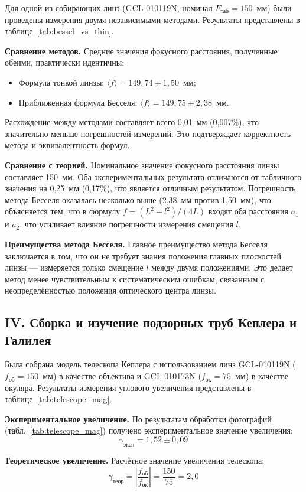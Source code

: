 \documentclass[a4paper]{article}
\begin{document}
Для одной из собирающих линз (GCL-010119N, номинал $F_\text{таб} = 150$~мм) были проведены измерения двумя независимыми методами. Результаты представлены в таблице~\ref{tab:bessel_vs_thin}.

\textbf{Сравнение методов.} Средние значения фокусного расстояния, полученные обеими, практически идентичны:
\begin{itemize}
    \item Формула тонкой линзы: $\langle f \rangle = 149{,}74 \pm 1{,}50$~мм;
    \item Приближенная формула Бесселя: $\langle f \rangle = 149{,}75 \pm 2{,}38$~мм.
\end{itemize}
Расхождение между методами составляет всего 0,01~мм (0,007\%), что значительно меньше погрешностей измерений. Это подтверждает корректность метода и эквивалентность формул.

\textbf{Сравнение с теорией.} Номинальное значение фокусного расстояния линзы составляет 150~мм. Оба экспериментальных результата отличаются от табличного значения на 0,25~мм (0,17\%), что является отличным результатом. Погрешность метода Бесселя оказалась несколько выше (2,38~мм против 1,50~мм), что объясняется тем, что в формулу $f = (L^2 - l^2)/(4L)$ входят оба расстояния $a_1$ и $a_2$, что усиливает влияние погрешности измерения смещения $l$.

\textbf{Преимущества метода Бесселя.} Главное преимущество метода Бесселя заключается в том, что он не требует знания положения главных плоскостей линзы — измеряется только смещение $l$ между двумя положениями. Это делает метод менее чувствительным к систематическим ошибкам, связанным с неопределённостью положения оптического центра линзы.

\subsection{IV. Сборка и изучение подзорных труб Кеплера и Галилея}

Была собрана модель телескопа Кеплера с использованием линз GCL-010119N ($f_\text{об} = 150$~мм) в качестве объектива и GCL-010173N ($f_\text{ок} = 75$~мм) в качестве окуляра. Результаты измерения углового увеличения представлены в таблице~\ref{tab:telescope_mag}.

\textbf{Экспериментальное увеличение.} По результатам обработки фотографий (табл.~\ref{tab:telescope_mag}) получено экспериментальное значение увеличения:
$$ \gamma_\text{эксп} = 1{,}52 \pm 0{,}09 $$

\textbf{Теоретическое увеличение.} Расчётное значение увеличения телескопа:
$$ \gamma_\text{теор} = \left|\frac{f_\text{об}}{f_\text{ок}}\right| = \frac{150}{75} = 2{,}0 $$
\end{document}
